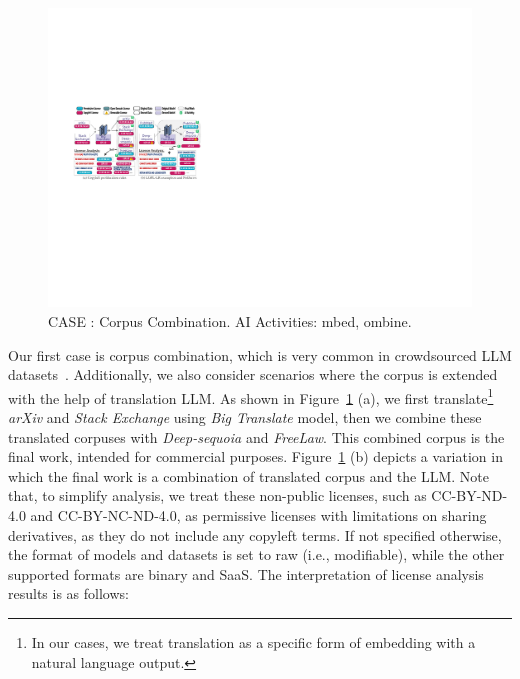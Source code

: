 \begin{figure}[h]
    \centering
    \includegraphics[width=\linewidth]{fig/case1.pdf}
    \caption{CASE : Corpus Combination. AI Activities: mbed, ombine.}
    \Description{}
    \label{fig:case1}
\end{figure}

Our first case is corpus combination, which is very common in crowdsourced LLM datasets~\cite{gao2020the, penedo2023refinedweb, kocetkov2023stack}. 
Additionally, we also consider scenarios where the corpus is extended with the help of translation LLM.
As shown in Figure~\ref{fig:case1} (a), we first translate\footnote{In our cases, we treat translation as a specific form of embedding with a natural language output.} \textit{arXiv} and \textit{Stack Exchange} using \textit{Big Translate} model, then we combine these translated corpuses with \textit{Deep-sequoia} and \textit{FreeLaw}.
This combined corpus is the final work, intended for commercial purposes.
Figure~\ref{fig:case1} (b) depicts a variation in which the final work is a combination of translated corpus and the LLM.
Note that, to simplify analysis, we treat these non-public licenses, such as CC-BY-ND-4.0 and CC-BY-NC-ND-4.0, as permissive licenses with limitations on sharing derivatives, as they do not include any copyleft terms.
If not specified otherwise, the format of models and datasets is set to raw (i.e., modifiable), while the other supported formats are binary and SaaS.
The interpretation of license analysis results is as follows:

